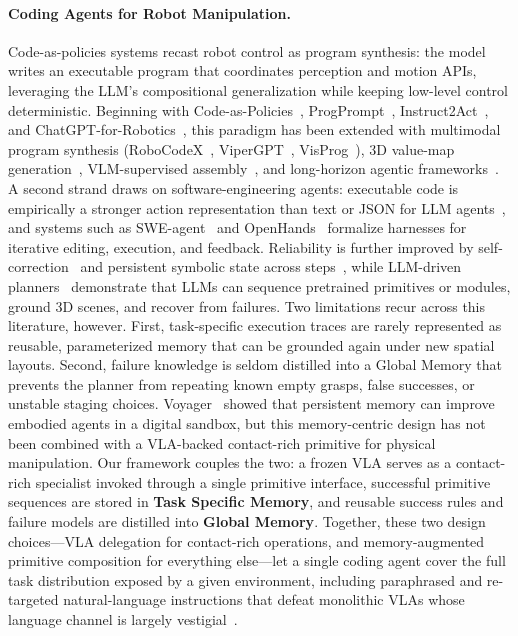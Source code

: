 \documentclass{article}
\begin{document}
	\paragraph{Coding Agents for Robot Manipulation.} Code-as-policies systems recast robot control as program synthesis: the model writes an executable program that coordinates perception and motion APIs, leveraging the LLM's compositional generalization while keeping low-level control deterministic. Beginning with Code-as-Policies~\citep{liang2023code}, ProgPrompt~\citep{singh2023progprompt}, Instruct2Act~\citep{huang2023instruct2act}, and ChatGPT-for-Robotics~\citep{vemprala2023chatgpt}, this paradigm has been extended with multimodal program synthesis (RoboCodeX~\citep{mu2024robocodex}, ViperGPT~\citep{suris2023vipergpt}, VisProg~\citep{gupta2023visprog}), 3D value-map generation~\citep{huang2023voxposer}, VLM-supervised assembly~\citep{goldberg2024bloxnet}, and long-horizon agentic frameworks~\citep{li2026roboclaw, shi2025maestro}. A second strand draws on software-engineering agents: executable code is empirically a stronger action representation than text or JSON for LLM agents~\citep{wang2024codeact}, and systems such as SWE-agent~\citep{yang2024sweagent} and OpenHands~\citep{wang2025openhands} formalize harnesses for iterative editing, execution, and feedback. Reliability is further improved by self-correction~\citep{shinn2023reflexion, madaan2023selfrefine, chen2023selfdebug} and persistent symbolic state across steps~\citep{yoneda2024statler}, while LLM-driven planners~\citep{ahn2022saycan, huang2022inner, mu2023embodiedgpt, zeng2023socratic, liu2023llmplanning, chen2024autotamp, rana2023sayplan, mandi2024roco} demonstrate that LLMs can sequence pretrained primitives or modules, ground 3D scenes, and recover from failures. Two limitations recur across this literature, however. First, task-specific execution traces are rarely represented as reusable, parameterized memory that can be grounded again under new spatial layouts. Second, failure knowledge is seldom distilled into a Global Memory that prevents the planner from repeating known empty grasps, false successes, or unstable staging choices. Voyager~\citep{wang2023voyager} showed that persistent memory can improve embodied agents in a digital sandbox, but this memory-centric design has not been combined with a VLA-backed contact-rich primitive for physical manipulation. Our framework couples the two: a frozen VLA serves as a contact-rich specialist invoked through a single primitive interface, successful primitive sequences are stored in \textbf{Task Specific Memory}, and reusable success rules and failure models are distilled into \textbf{Global Memory}. Together, these two design choices---VLA delegation for contact-rich operations, and memory-augmented primitive composition for everything else---let a single coding agent cover the full task distribution exposed by a given environment, including paraphrased and re-targeted natural-language instructions that defeat monolithic VLAs whose language channel is largely vestigial~\citep{kim2024openvla, black2025pi05}.
\end{document}
